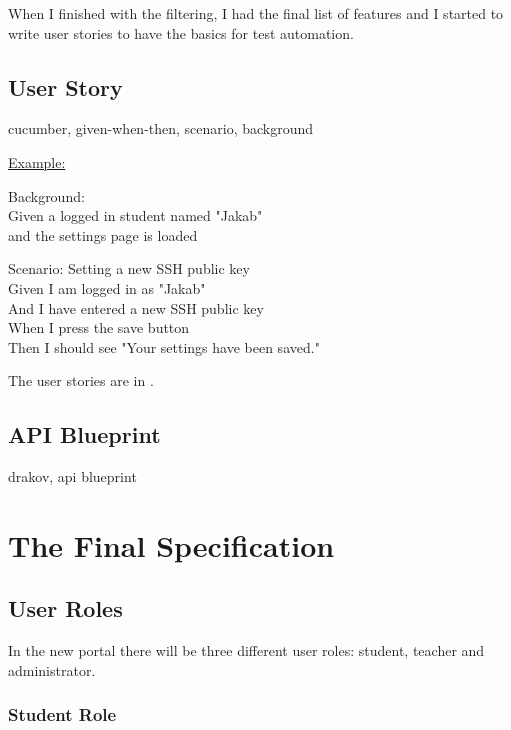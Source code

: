 When I finished with the filtering, I had the final list of features  and I started to write user stories to have the basics for test automation.

\subsection{User Story}

 cucumber, given-when-then, scenario, background

\underline{Example:}

Background:\\ \hspace*{1cm}
Given a logged in student named "Jakab"\\ \hspace*{1cm}
and the settings page is loaded

Scenario: Setting a new SSH public key\\ \hspace*{1cm}
Given I am logged in as "Jakab"\\ \hspace*{1cm}
And I have entered a new SSH public key\\ \hspace*{1cm}
When I press the save button\\ \hspace*{1cm}
Then I should see "Your settings have been saved."


The user stories are in .

\subsection{API Blueprint}

drakov, api blueprint

\section{The Final Specification} \label{final-spec}
\subsection{User Roles}

In the new portal there will be three different user roles: student, teacher and administrator. 

\subsubsection{Student Role}

